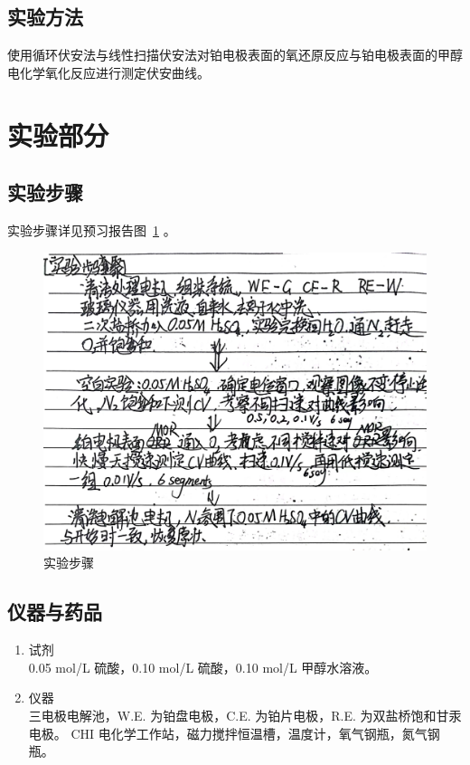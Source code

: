 \documentclass[cn,hazy,pku,12pt,normal,math=newtx,cite=super]{elegantnote}
\begin{document}
\subsection{实验方法}

使用循环伏安法与线性扫描伏安法对铂电极表面的氧还原反应与铂电极表面的甲醇电化学氧化反应进行测定伏安曲线。


\section{实验部分}

\subsection{实验步骤}

实验步骤详见预习报告图~\ref{b} 。
\begin{figure}[htbp]
    \centering
    \includegraphics[width = .70\textwidth]{image/yxbg_2.jpg}
    \caption{实验步骤}\label{b}
\end{figure}


\subsection{仪器与药品}

\begin{enumerate} %
    \item 试剂 \\   0.05 mol/L 硫酸，0.10 mol/L 硫酸，0.10 mol/L 甲醇水溶液。

    \item 仪器 \\   三电极电解池，W.E. 为铂盘电极，C.E. 为铂片电极，R.E. 为双盐桥饱和甘汞电极。
    CHI 电化学工作站，磁力搅拌恒温槽，温度计，氧气钢瓶，氮气钢瓶。
\end{enumerate}
\end{document}
